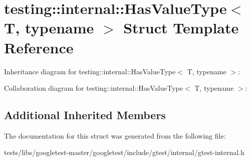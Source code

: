 \hypertarget{structtesting_1_1internal_1_1HasValueType}{}\section{testing\+:\+:internal\+:\+:Has\+Value\+Type$<$ T, typename $>$ Struct Template Reference}
\label{structtesting_1_1internal_1_1HasValueType}


Inheritance diagram for testing\+:\+:internal\+:\+:Has\+Value\+Type$<$ T, typename $>$\+:


Collaboration diagram for testing\+:\+:internal\+:\+:Has\+Value\+Type$<$ T, typename $>$\+:
\subsection*{Additional Inherited Members}


The documentation for this struct was generated from the following file\+:\begin{DoxyCompactItemize}
\item 
tests/libs/googletest-\/master/googletest/include/gtest/internal/gtest-\/internal.\+h\end{DoxyCompactItemize}
